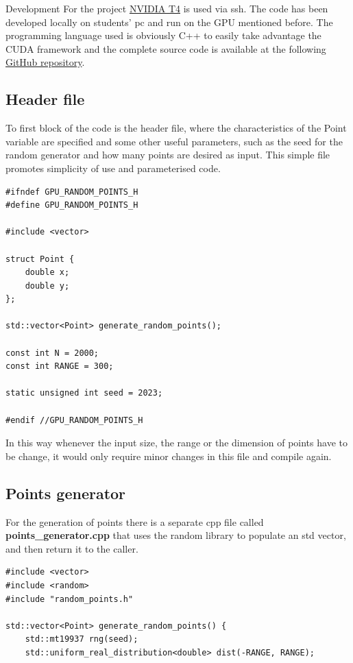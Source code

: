 \documentclass[a4paper,oneside,11pt,DIV12,headsepline,footexclude,headexclude]{scrartcl}
\begin{document}
\begin{section}{Development}
For the project \href{https://www.nvidia.com/en-us/data-center/tesla-t4/}{NVIDIA T4} is used via ssh. The code has been developed locally on students' pc and run on the GPU mentioned before. The programming language used is obviously C++ to easily take advantage the CUDA framework and the complete source code is available at the following \href{https://github.com/cima22/CUDA_PlanarConvexHull/tree/main}{GitHub repository}.
\subsection{Header file}
To first block of the code is the header file, where the characteristics of the Point variable are specified and some other useful parameters, such as the seed for the random generator and how many points are desired as input. This simple file promotes simplicity of use and parameterised code.
\lstset{language=C++}
\begin{lstlisting}[caption={Header file.}, captionpos=b]
#ifndef GPU_RANDOM_POINTS_H
#define GPU_RANDOM_POINTS_H

#include <vector>

struct Point {
    double x;
    double y;
};

std::vector<Point> generate_random_points();

const int N = 2000;
const int RANGE = 300;

static unsigned int seed = 2023;

#endif //GPU_RANDOM_POINTS_H
\end{lstlisting}
In this way whenever the input size, the range or the dimension of points have to be change, it would only require minor changes in this file and compile again.
\subsection{Points generator}
For the generation of points there is a separate cpp file called \textbf{points\_generator.cpp} that uses the random library to populate an std vector, and then return it to the caller.
\lstset{language=C++}
\begin{lstlisting}[caption={Random points generator.}, captionpos=b]
#include <vector>
#include <random>
#include "random_points.h"

std::vector<Point> generate_random_points() {
    std::mt19937 rng(seed);
    std::uniform_real_distribution<double> dist(-RANGE, RANGE);


\end{lstlisting}
\end{section}
\end{document}
